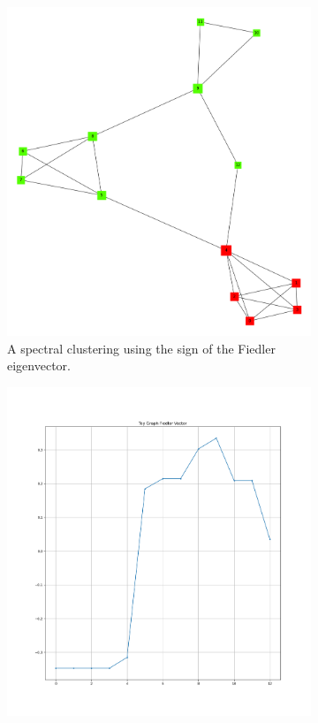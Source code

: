 \documentclass[a4paper,10pt]{article}
\theoremstyle{definition}
\theoremstyle{remark}
\theoremstyle{plain}
\begin{document}
\begin{figure}
\centering
\begin{subfigure}[b]{0.5\textwidth}
\includegraphics[width=\textwidth]{example_spectralT2clustering.png}
\caption{A spectral clustering using the sign of the Fiedler eigenvector.}
\label{fig:toygraphspectralclustering}
\end{subfigure}
\begin{subfigure}[b]{0.5\textwidth}
\includegraphics[width=\textwidth]{Toygraph_Fiedler.png}

\end{subfigure}
\end{figure}
\end{document}
